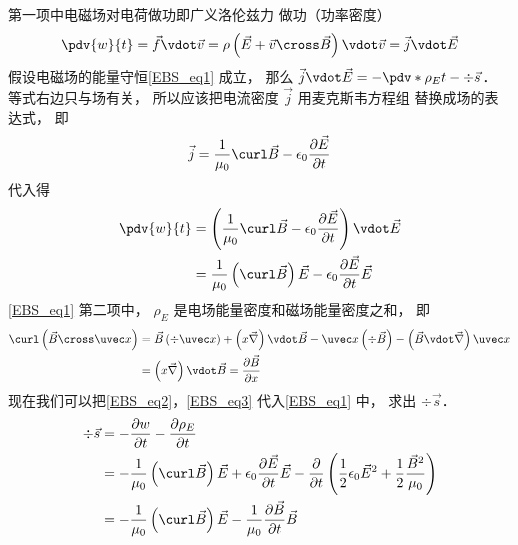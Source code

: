 第一项中电磁场对电荷做功即广义洛伦兹力%
做功（功率密度）
\begin{equation}
\pdv{w}{t} = \vec f \vdot \vec v = \rho \left( {\vec E + \vec v \cross \vec B} \right) \vdot \vec v = \vec j \vdot \vec E
\end{equation} 
假设电磁场的能量守恒\autoref{EBS_eq1} 成立， 那么 $\vec j \vdot \vec E =  - \pdv*{\rho_E}{t} - \div \vec s$． 等式右边只与场有关， 所以应该把电流密度 $\vec j$ 用麦克斯韦方程组%
替换成场的表达式， 即
\begin{equation}
\vec j = \frac{1}{{{\mu _0}}}\curl \vec B - {\epsilon _0}\frac{{\partial \vec E}}{{\partial t}}
\end{equation} 
代入得
\begin{equation}\label{EBS_eq2}
\begin{aligned}
\pdv{w}{t} &= \left( {\frac{1}{{{\mu _0}}}\curl \vec B - {\epsilon _0}\frac{{\partial \vec E}}{{\partial t}}} \right) \vdot \vec E\\
&= \frac{1}{{{\mu _0}}}\left( {\curl \vec B} \right)\vec E - {\epsilon _0}\frac{{\partial \vec E}}{{\partial t}}\vec E
\end{aligned}
\end{equation} 
\autoref{EBS_eq1} 第二项中， ${\rho _E}$ 是电场能量密度和磁场能量密度之和， 即
\begin{equation}\label{EBS_eq3}
\begin{aligned}
\curl \left( {\vec B \cross \uvec x} \right) &= \vec B\left( {\div \uvec x} \right) + \left( {x\vec\nabla } \right)\vdot\vec B - \uvec x\left( {\div \vec B} \right) - \left( {\vec B\vdot\vec\nabla } \right)\uvec x \\
&= \left( {x\vec\nabla } \right)\vdot\vec B = \frac{{\partial \vec B}}{{\partial x}}
\end{aligned}\end{equation} 
现在我们可以把\autoref{EBS_eq2}，\autoref{EBS_eq3} 代入\autoref{EBS_eq1} 中， 求出 $\div \vec s$． 
\begin{equation}
\begin{aligned}
\div \vec s &=  - \frac{{\partial w}}{{\partial t}} - \frac{{\partial {\rho _E}}}{{\partial t}}\\
&=  - \frac{1}{{{\mu _0}}}\left( {\curl \vec B} \right)\vec E + {\epsilon _0}\frac{{\partial \vec E}}{{\partial t}}\vec E - \frac{\partial }{{\partial t}}\left( {\frac{1}{2}{\epsilon _0}{{\vec E}^2} + \frac{1}{2}\frac{{{{\vec B}^2}}}{{{\mu _0}}}} \right)\\
&=  - \frac{1}{{{\mu _0}}}\left( {\curl \vec B} \right)\vec E - \frac{1}{{{\mu _0}}}\frac{{\partial \vec B}}{{\partial t}}\vec B
\end{aligned}
\end{equation} 
